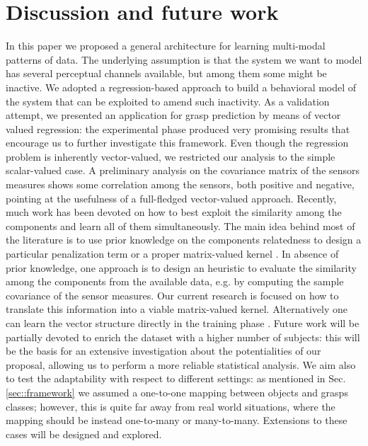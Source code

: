 \section{Discussion and future work}
In this paper we proposed a general architecture for learning multi-modal patterns of data. 
The underlying assumption is that the system we want to model has several perceptual channels available, 
but among them some might be inactive. 
We adopted a regression-based approach to build a behavioral model of the system 
that can be exploited to amend such inactivity.
As a validation attempt, we presented an application for grasp prediction by means of vector 
valued regression: the experimental phase produced very promising results that encourage 
us to further investigate this framework. 
Even though the regression problem is inherently vector-valued, we  restricted 
our analysis to the simple scalar-valued case. 
A preliminary analysis on the covariance matrix of the sensors measures 
shows some correlation among the sensors, both positive and negative, 
pointing at the usefulness of a full-fledged vector-valued approach. 
Recently, much work has been devoted on how to best exploit the similarity among the components 
and learn all of them simultaneously. The main idea behind most of the literature is to use prior 
knowledge on the components relatedness to design a particular penalization term or a proper 
matrix-valued kernel \cite{micchelli04kernels}. 
In absence of prior knowledge, one approach is to design an heuristic to evaluate the similarity 
among the components from the available data, e.g. by computing the sample covariance of the 
sensor measures. 
Our current research is focused on how to translate this information into a viable matrix-valued kernel. 
Alternatively one can learn the vector structure directly in the training phase 
\cite{pontil08transferlearning,jacob08clusteredmtl}.
Future work will be partially devoted to enrich the dataset with a higher number of subjects: 
this will be the basis for an extensive investigation about the potentialities of our proposal, allowing 
us to perform a more reliable statistical analysis. 
We aim also to test the adaptability with respect to different settings: as mentioned in 
Sec. \ref{sec::framework} we assumed a one-to-one mapping between objects and grasps classes; 
however, this is quite far away from real world situations, where the mapping should be instead 
one-to-many or many-to-many. Extensions to these cases will be designed and explored.

